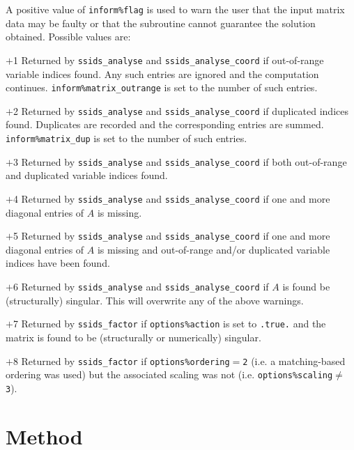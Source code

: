 \documentclass{spral}
\begin{document}
A positive value of {\tt inform\%flag}
is used to warn the user that the input matrix data may be faulty or that
the subroutine cannot guarantee the solution obtained.
Possible values are:
\begin{description}
\item{$+$1} Returned by {\tt ssids\_analyse}
and {\tt ssids\_analyse\_coord} if out-of-range variable
indices found.
Any such entries are ignored  and the computation continues.
{\tt inform\%matrix\_outrange} is set to the number of such entries.

\item{$+$2} Returned by {\tt ssids\_analyse} and {\tt ssids\_analyse\_coord}
if duplicated indices found. Duplicates are recorded and the corresponding
entries are summed. {\tt inform\%matrix\_dup} is set to the number of such entries.

\item{$+$3} Returned by {\tt ssids\_analyse}  and {\tt ssids\_analyse\_coord} if both
out-of-range and duplicated variable indices found.

\item{$+$4} Returned by {\tt ssids\_analyse}  and {\tt ssids\_analyse\_coord}
if  one and more diagonal entries
of $A$ is missing.

\item{$+$5} Returned by {\tt ssids\_analyse}  and {\tt ssids\_analyse\_coord}
if  one and more diagonal entries
of $A$ is missing  and
out-of-range and/or duplicated variable indices have been found.

\item{$+$6} Returned by {\tt ssids\_analyse}  and {\tt ssids\_analyse\_coord} if
$A$ is found be (structurally) singular. This will overwrite any of the above warnings.

\item{$+$7} Returned by {\tt ssids\_factor} if {\tt options\%action} is set
to {\tt .true.} and the matrix is found to be (structurally or numerically)
singular.

\item{$+$8} Returned by {\tt ssids\_factor} if
{\tt options\%ordering}$=${\tt 2} (i.e.
a matching-based ordering was used) but the associated scaling was not (i.e. {\tt options\%scaling}$\ne$
{\tt 3}).

\end{description}

\section{Method} \label{method}
\end{document}
